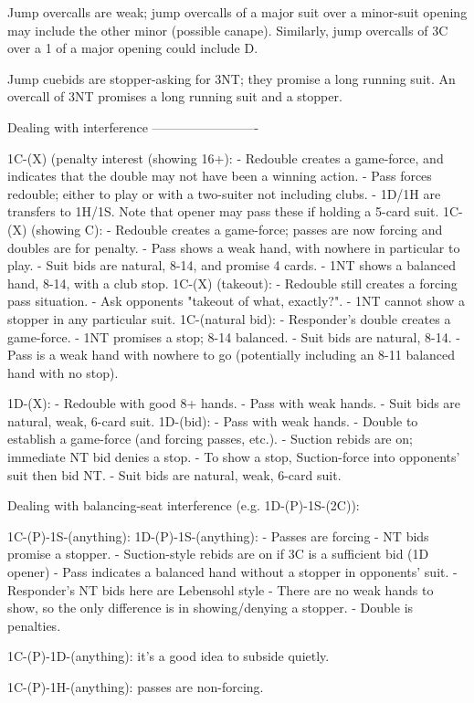 Jump overcalls are weak; jump overcalls of a major suit over a minor-suit
opening may include the other minor (possible canape).  Similarly, jump
overcalls of 3C over a 1 of a major opening could include D.

Jump cuebids are stopper-asking for 3NT; they promise a long running suit.  An
overcall of 3NT promises a long running suit and a stopper.

Dealing with interference
-------------------------

1C-(X) (penalty interest (showing 16+):
   - Redouble creates a game-force, and indicates that the double may not have been 
      a winning action.
   - Pass forces redouble; either to play or with a two-suiter not including clubs.
   - 1D/1H are transfers to 1H/1S.  Note that opener may pass these if holding a 5-card 
      suit.
1C-(X) (showing C):
   - Redouble creates a game-force; passes are now forcing and doubles are for penalty.
   - Pass shows a weak hand, with nowhere in particular to play.
   - Suit bids are natural, 8-14, and promise 4 cards.
   - 1NT shows a balanced hand, 8-14, with a club stop.
1C-(X) (takeout):
   - Redouble still creates a forcing pass situation.
   - Ask opponents "takeout of what, exactly?".
   - 1NT cannot show a stopper in any particular suit.
1C-(natural bid):
   - Responder's double creates a game-force.
   - 1NT promises a stop; 8-14 balanced.
   - Suit bids are natural, 8-14.
   - Pass is a weak hand with nowhere to go (potentially including an 8-11 balanced hand with no stop).

1D-(X):
   - Redouble with good 8+ hands.
   - Pass with weak hands.
   - Suit bids are natural, weak, 6-card suit.
1D-(bid):
   - Pass with weak hands.
   - Double to establish a game-force (and forcing passes, etc.).
      - Suction rebids are on; immediate NT bid denies a stop.
      - To show a stop, Suction-force into opponents' suit then bid NT.
   - Suit bids are natural, weak, 6-card suit.

Dealing with balancing-seat interference (e.g. 1D-(P)-1S-(2C)):

1C-(P)-1S-(anything):
1D-(P)-1S-(anything):
   - Passes are forcing
   - NT bids promise a stopper.
   - Suction-style rebids are on if 3C is a sufficient bid (1D opener)
   - Pass indicates a balanced hand without a stopper in opponents' suit.
      - Responder's NT bids here are Lebensohl style
      - There are no weak hands to show, so the only difference is in showing/denying a stopper.
   - Double is penalties.

1C-(P)-1D-(anything): it's a good idea to subside quietly.  

1C-(P)-1H-(anything): passes are non-forcing. 

